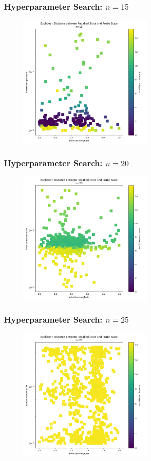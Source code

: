 \begin{frame}
    \frametitle{Hyperparameter Search: \(n=15\)}

    \begin{figure}
        \includegraphics[width=0.6\textwidth]{images/hyperparameterSearches/15.png}
    \end{figure}
\end{frame}

\begin{frame}
    \frametitle{Hyperparameter Search: \(n=20\)}

    \begin{figure}
        \includegraphics[width=0.6\textwidth]{images/hyperparameterSearches/20.png}
    \end{figure}
\end{frame}

\begin{frame}
    \frametitle{Hyperparameter Search: \(n=25\)}

    \begin{figure}
        \includegraphics[width=0.6\textwidth]{images/hyperparameterSearches/25.png}
    \end{figure}
\end{frame}

